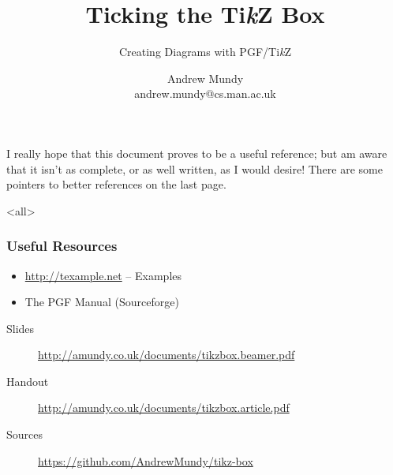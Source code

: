 \title{Ticking the Ti\emph{k}Z Box}
\subtitle{Creating Diagrams with PGF/Ti\emph{k}Z}
\author{Andrew Mundy\\andrew.mundy@cs.man.ac.uk}
\date{}

\usepackage{tikz}
\usetikzlibrary{automata,chains,scopes,patterns,petri}

\usepackage{etoolbox}

\usepackage{subcaption}

\lstset{
	frame = tb,
	columns = fullflexible,
}


	\maketitle
	\begin{frame}
		\titlepage
	\end{frame}

	I really hope that this document proves to be a useful reference; but am aware that it isn't as complete, or as well written, as I would desire!
	There are some pointers to better references on the last page.

	\mode<all>
		
		
		\appendix
		
	\mode*

	\begin{frame}
		\frametitle{Useful Resources}
		\begin{itemize}
			\item \url{http://texample.net} -- Examples
			\item The PGF Manual (Sourceforge)
		\end{itemize}

		\begin{description}
			\item[Slides] \url{http://amundy.co.uk/documents/tikzbox.beamer.pdf}
			\item[Handout] \url{http://amundy.co.uk/documents/tikzbox.article.pdf}
			\item[Sources] \url{https://github.com/AndrewMundy/tikz-box}
		\end{description}
	\end{frame}

